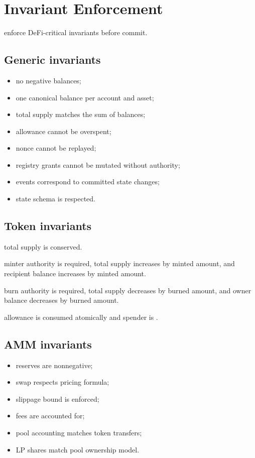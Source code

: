 \section{Invariant Enforcement}

\SCS{} \MUST{} enforce DeFi-critical invariants before commit.

\subsection{Generic invariants}

\begin{itemize}
  \item no negative balances;
  \item one canonical balance per account and asset;
  \item total supply matches the sum of balances;
  \item allowance cannot be overspent;
  \item nonce cannot be replayed;
  \item registry grants cannot be mutated without authority;
  \item events correspond to committed state changes;
  \item state schema is respected.
\end{itemize}

\subsection{Token invariants}

\begin{description}[leftmargin=2.8cm]
  \item[Transfer] total supply is conserved.
  \item[Mint] minter authority is required, total supply increases by minted amount, and recipient balance increases by minted amount.
  \item[Burn] burn authority is required, total supply decreases by burned amount, and owner balance decreases by burned amount.
  \item[transferFrom] allowance is consumed atomically and spender is .
\end{description}

\subsection{AMM invariants}

\begin{itemize}
  \item reserves are nonnegative;
  \item swap respects pricing formula;
  \item slippage bound is enforced;
  \item fees are accounted for;
  \item pool accounting matches token transfers;
  \item LP shares match pool ownership model.
\end{itemize}

